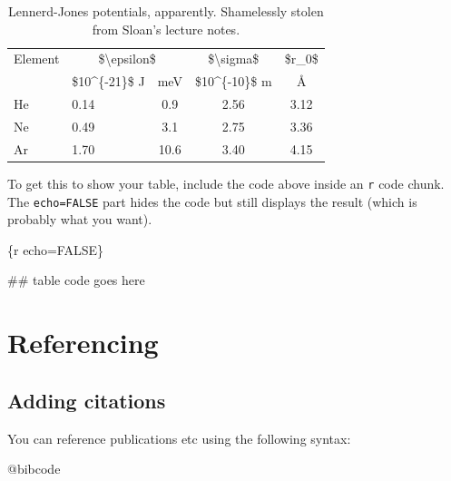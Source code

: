 \documentclass[
]{book}
\newenvironment{Shaded}{\begin{snugshade}}{\end{snugshade}}
\newcommand{\AttributeTok}[1]{\textcolor[rgb]{0.13,0.29,0.53}{#1}}
\newcommand{\NormalTok}[1]{#1}
\newcommand{\StringTok}[1]{\textcolor[rgb]{0.31,0.60,0.02}{#1}}
\begin{document}
\begin{table}

\caption{\label{tab:unnamed-chunk-5}Lennerd-Jones potentials, apparently. Shamelessly stolen from Sloan's lecture notes.}
\centering
\begin{tabular}[t]{l|l|c|c|c}
\hline
\multicolumn{1}{l|}{Element} & \multicolumn{2}{c|}{\$\textbackslash{}epsilon\$} & \multicolumn{1}{c|}{\$\textbackslash{}sigma\$} & \multicolumn{1}{c}{\$r\_0\$} \\
\cline{1-1} \cline{2-3} \cline{4-4} \cline{5-5}
  & \$10\textasciicircum{}\{-21\}\$ J & meV & \$10\textasciicircum{}\{-10\}\$ m & Å\\
\hline
He & 0.14 & 0.9 & 2.56 & 3.12\\
\hline
Ne & 0.49 & 3.1 & 2.75 & 3.36\\
\hline
Ar & 1.70 & 10.6 & 3.40 & 4.15\\
\hline
\end{tabular}
\end{table}

To get this to show your table, include the code above inside an \texttt{r} code chunk. The \texttt{echo=FALSE} part hides the code but still displays the result (which is probably what you want).

\begin{Shaded}
\begin{Highlighting}[]
\StringTok{\textasciigrave{}\textasciigrave{}\textasciigrave{}}
\AttributeTok{\{r echo=FALSE\}}

\AttributeTok{\#\# table code goes here}

\StringTok{\textasciigrave{}\textasciigrave{}\textasciigrave{}}
\end{Highlighting}
\end{Shaded}

\chapter{Referencing}\label{sec:referencing}

\section{Adding citations}\label{sec:add-cite}

You can reference publications etc using the following syntax:

\begin{Shaded}
\begin{Highlighting}[]
\NormalTok{@bibcode }
\end{Highlighting}
\end{Shaded}
\end{document}
